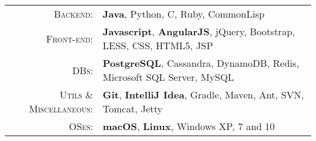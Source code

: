 %
%
%

\renewcommand{\arraystretch}{1.1}

	\begin{tabular}{>{}r>{}p{13cm}} 
		\textsc{Backend:} &
			\textbf{Java}, Python, C, Ruby, CommonLisp \\
		\textsc{Front-end:} &
			\textbf{Javascript}, \textbf{AngularJS}, jQuery, Bootstrap, LESS, CSS, HTML5, JSP \\ 
		\textsc{DBs:} & 
			\textbf{PostgreSQL}, Cassandra, DynamoDB, Redis, Microsoft SQL Server, MySQL \\ 
		\textsc{Utils \& Miscellaneous:} &
			\textbf{Git}, \textbf{IntelliJ Idea}, Gradle, Maven, Ant, SVN, Tomcat, Jetty \\
		\textsc{OSes:} &
			\textbf{macOS}, \textbf{Linux}, Windows XP, 7 and 10 \\ 
	\end{tabular}